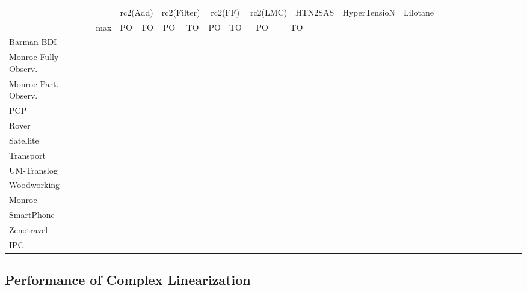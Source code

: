 \documentclass[letterpaper]{article} %
\begin{document}
\begin{table}[h]
	\scalebox{0.45} {
		\begin{tabular}{lccccccccccccccccccccccccl} 
			\toprule 
			&& \multicolumn{2}{c}{rc2(Add)} & \multicolumn{2}{c}{rc2(Filter)} & \multicolumn{2}{c}{rc2(FF)} & \multicolumn{2}{c}{rc2(LMC)}  & \multicolumn{2}{c}{HTN2SAS} & \multicolumn{2}{c}{HyperTensioN} & \multicolumn{2}{c}{Lilotane} \\ 
			\cmidrule(lr){3-4} \cmidrule(lr){5-6} \cmidrule(lr){7-8} \cmidrule(lr){9-10} \cmidrule(lr){11-12}  \cmidrule(lr){13-14} \cmidrule(lr){15-16}    
			& max &PO & TO & PO & TO & PO & TO & PO &\multicolumn{2}{c}{ TO  }   \\ 
			\midrule 
			Barman-BDI  \\ 
			Monroe Fully Observ. \\ 
			Monroe Part. Observ. \\ 
			PCP\\ 
			Rover  \\ 
			Satellite  \\ 
			Transport \\ 
			UM-Translog \\ 
			Woodworking \\ 
			\midrule 
			Monroe  \\ 
			SmartPhone \\ 
			Zenotravel \\ 
			\midrule 
			IPC \\
			\bottomrule
		\end{tabular} 	
	}
\end{table}


\subsection{Performance of Complex Linearization}
\end{document}
